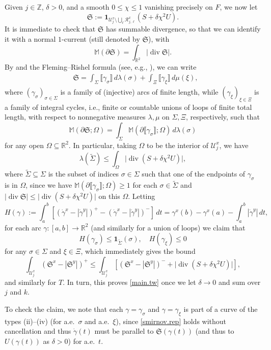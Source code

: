 \documentclass[11pt,a4paper]{amsart}
\newcommand{\Z}{\mathbb{Z}}
\newcommand{\R}{\mathbb{R}}
\newcommand{\de}{\partial}
\newcommand{\uno}{\bm{1}}
\theoremstyle{definition}
\newcommand{\str}{\mathcal{U}}
\begin{document}
Given $j\in\Z$, $\delta>0$, and a smooth $0\le\chi\le1$ vanishing precisely on $F$, we now let
$$\mathfrak{S}:=\uno_{\str_j^x\setminus\bigcup_\ell\mathcal{R}_{j,\ell}^x}(S+\delta\chi^2 U).$$
It is immediate to check that $\mathfrak{S}$ has summable divergence, so that
we can identify it with a normal $1$-current (still denoted by $\mathfrak{S}$), with
$$\mathbb{M}(\de\mathfrak{S})=\int_{\R^2}\lvert\operatorname{div}\mathfrak{S}\rvert.$$
By \cite[Theorem C]{Smirnov} and the Fleming--Rishel formula (see, e.g., \cite[p. 849]{Smirnov}), we can write
\begin{align}\label{smirnov.rep}
&\mathfrak{S}=\int_\Sigma\llbracket\gamma_\sigma\rrbracket\,d\lambda(\sigma)
+\int_\Xi\llbracket\gamma_\xi\rrbracket\,d\mu(\xi),
\end{align}
where $(\gamma_\sigma)_{\sigma\in\Sigma}$ is a family of (injective) arcs of finite length,
while $(\gamma_\xi)_{\xi\in\Xi}$ is a family of integral cycles, i.e., finite or countable unions
of loops of finite total length, with respect to nonnegative measures $\lambda,\mu$ on $\Sigma,\Xi$, respectively, such that
$$\mathbb{M}(\de\mathfrak{S};\Omega)=\int_\Sigma\mathbb{M}(\de\llbracket\gamma_\sigma\rrbracket;\Omega)\,d\lambda(\sigma)$$
for any open $\Omega\subseteq\R^2$. In particular, taking $\Omega$ to be the interior of $\str_j^x$, we have
$$\lambda(\tilde\Sigma)\le\int_{\Omega}\lvert\operatorname{div}(S+\delta\chi^2 U)\rvert,$$
where $\tilde\Sigma\subseteq\Sigma$ is the subset of indices $\sigma\in\Sigma$ such that
one of the endpoints of $\gamma_\sigma$ is in $\Omega$,
since we have $\mathbb{M}(\de\llbracket\gamma_\sigma\rrbracket;\Omega)\ge1$ for each
$\sigma\in\tilde\Sigma$ and $\lvert\operatorname{div}\mathfrak{S}\rvert\le\lvert\operatorname{div}(S+\delta\chi^2 U)\rvert$ on this $\Omega$.
Letting
$$H(\gamma):=\int_a^b[(\dot\gamma^x-|\dot\gamma^y|)^+ - (\dot\gamma^x-|\dot\gamma^y|)^-]\,dt=\gamma^x(b)-\gamma^x(a)-\int_a^b|\dot\gamma^y|\,dt,$$
for each arc $\gamma:[a,b]\to\R^2$ (and similarly for a union of loops)
we claim that
$$H(\gamma_\sigma)\le \uno_{\tilde\Sigma}(\sigma),\quad H(\gamma_\xi)\le0$$
for any $\sigma\in\Sigma$ and $\xi\in\Xi$, which immediately gives the bound
$$\int_{\str_j^x}(\mathfrak{S}^x-|\mathfrak{S}^y|)^+
\le \int_{\str_j^x}[(\mathfrak{S}^x-|\mathfrak{S}^y|)^- + \lvert\operatorname{div}(S+\delta\chi^2U)\rvert],$$
and similarly for $T$.
In turn, this proves \cref{main.tw} once we let $\delta\to0$ and sum over $j$ and $k$.

To check the claim, we note that each $\gamma=\gamma_\sigma$ and $\gamma=\gamma_\xi$
is part of a curve of the types (ii)--(iv) (for a.e.\ $\sigma$ and a.e.\ $\xi$),
since \cref{smirnov.rep} holds without cancellation and thus $\dot\gamma(t)$ must be parallel to
$\mathfrak{S}(\gamma(t))$ (and thus to $U(\gamma(t))$ as $\delta>0$) for a.e.\ $t$.
\end{document}
